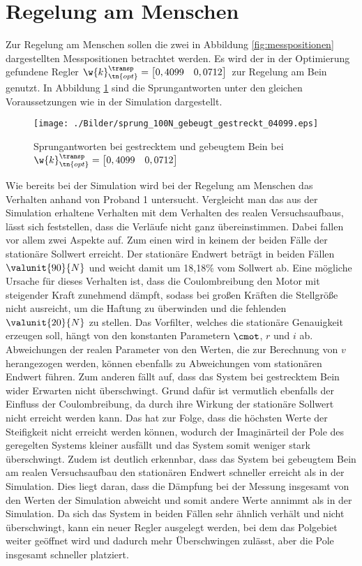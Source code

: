\section{Regelung am Menschen}\label{sec:regelung_am_menschen}
Zur Regelung am Menschen sollen die zwei in Abbildung \ref{fig:messpositionen} dargestellten Messpositionen betrachtet werden. Es wird der in der Optimierung gefundene Regler $\w{k}_\tn{opt}^\transp = \begin{bmatrix} 0,4099 & 0,0712 \\ \end{bmatrix} \, $ zur Regelung am Bein genutzt. In Abbildung \ref{fig:sprungantwort_bein} sind die Sprungantworten unter den gleichen Voraussetzungen wie in der Simulation dargestellt. 
\begin{figure}[H]
	\centering
	\texttt{[image: ./Bilder/sprung\_100N\_gebeugt\_gestreckt\_04099.eps]}
	\caption[sprungantwort_bein]{Sprungantworten bei gestrecktem und gebeugtem Bein bei $\w{k}_\tn{opt}^\transp = \begin{bmatrix} 0,4099 & 0,0712\end{bmatrix}$}
	\label{fig:sprungantwort_bein}
\end{figure}
Wie bereits bei der Simulation wird bei der Regelung am Menschen das Verhalten anhand von Proband 1 untersucht. Vergleicht man das aus der Simulation erhaltene Verhalten mit dem Verhalten des realen Versuchsaufbaus, lässt sich feststellen, dass die Verläufe nicht ganz übereinstimmen. Dabei fallen vor allem zwei Aspekte auf. Zum einen wird in keinem der beiden Fälle der stationäre Sollwert erreicht. Der stationäre Endwert beträgt in beiden Fällen $\valunit{90}{N}$ und weicht damit um 18,18\% vom Sollwert ab. Eine mögliche Ursache für dieses Verhalten ist, dass die Coulombreibung den Motor mit steigender Kraft zunehmend dämpft, sodass bei großen Kräften die Stellgröße nicht ausreicht, um die Haftung zu überwinden und die fehlenden $\valunit{20}{N}$ zu stellen. Das Vorfilter, welches die stationäre Genauigkeit erzeugen soll, hängt von den konstanten Parametern $\cmot$, $r$ und $i$ ab. Abweichungen der realen Parameter von den Werten, die zur Berechnung von $v$ herangezogen werden, können ebenfalls zu Abweichungen vom stationären Endwert führen. Zum anderen fällt auf, dass das System bei gestrecktem Bein wider Erwarten nicht überschwingt. Grund dafür ist vermutlich ebenfalls der Einfluss der Coulombreibung, da durch ihre Wirkung der stationäre Sollwert nicht erreicht werden kann. Das hat zur Folge, dass die höchsten Werte der Steifigkeit nicht erreicht werden können, wodurch der Imaginärteil der Pole des geregelten Systems kleiner ausfällt und das System somit weniger stark überschwingt. Zudem ist deutlich erkennbar, dass das System bei gebeugtem Bein am realen Versuchsaufbau den stationären Endwert schneller erreicht als in der Simulation. Dies liegt daran, dass die Dämpfung bei der Messung insgesamt von den Werten der Simulation abweicht und somit andere Werte annimmt als in der Simulation. Da sich das System in beiden Fällen sehr ähnlich verhält und nicht überschwingt, kann ein neuer Regler ausgelegt werden, bei dem das Polgebiet weiter geöffnet wird und dadurch mehr Überschwingen zulässt, aber die Pole insgesamt schneller platziert.

